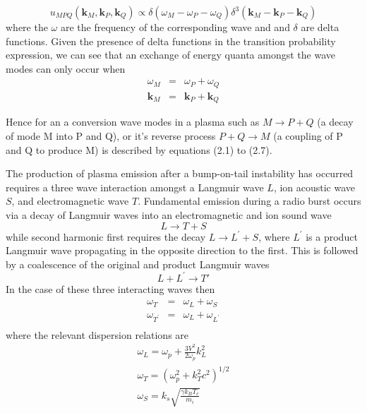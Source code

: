 \begin{equation}
u_{MPQ}(\mathbf{k}_M, \mathbf{k}_P, \mathbf{k}_Q)  \propto \delta(\omega_M - \omega_P - \omega_Q ) \delta^3(\mathbf{k}_M - \mathbf{k}_P - \mathbf{k}_Q )
\end{equation}
where the $\omega$ are the frequency of the corresponding wave and and $\delta$ are delta functions. Given the presence of delta functions in the transition probability expression, we can see that an exchange of energy quanta amongst the wave modes can only occur when 
\begin{eqnarray}
\omega_M & = & \omega_P + \omega_Q \\
\mathbf{k}_M & = & \mathbf{k}_P + \mathbf{k}_Q
\end{eqnarray}

Hence for an a conversion wave modes in a plasma such as $M \rightarrow P + Q$ (a decay of mode M into P and Q), or it's reverse process $P + Q \rightarrow M $ (a coupling of P and Q to produce M) is described by equations (2.1) to (2.7). 

The production of plasma emission after a bump-on-tail instability has occurred requires a three wave interaction amongst a Langmuir wave $L$, ion acoustic wave $S$, and electromagnetic wave $T$. Fundamental emission during a radio burst occurs via a decay of Langmuir waves into an electromagnetic and ion sound wave
\begin{equation}
L \rightarrow T + S
\label{eqn:fund}
\end{equation}
while second harmonic first requires the decay $L\rightarrow L^{'} + S$, where $L^{'}$ is a product Langmuir wave propagating in the opposite direction to the first. This is followed by a coalescence of the original and product Langmuir waves
\begin{equation}
L + L^{'}\rightarrow T'
\label{eqn:harm}
\end{equation}
In the case of these three interacting waves then 
\begin{eqnarray}
\omega_T & = & \omega_L + \omega_S \\
\omega_{T^{'}} & = & \omega_L + \omega_{L^{'}} \\
\end{eqnarray}
where the relevant dispersion relations are 
\begin{eqnarray}
\omega_L = \omega_p + \frac{3V^2}{2\omega_p}k_L^2 \\
\omega_T = (\omega_p^2 +k_T^2c^2)^{1/2} \\
\omega_S = k_s\sqrt{\frac{\gamma k_B T_e}{m_i}}
\end{eqnarray}

